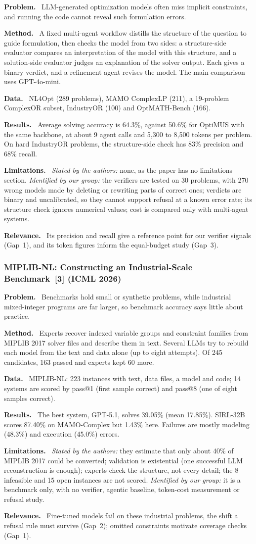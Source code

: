 \documentclass[11pt,a4paper]{article}
\newcommand{\elem}[1]{\par\noindent\textbf{#1.}~}
\begin{document}
\elem{Problem} LLM-generated optimization models often miss implicit constraints, and running the code cannot reveal such formulation errors.
\elem{Method} A fixed multi-agent workflow distills the structure of the question to guide formulation, then checks the model from two sides: a structure-side evaluator compares an interpretation of the model with this structure, and a solution-side evaluator judges an explanation of the solver output. Each gives a binary verdict, and a refinement agent revises the model. The main comparison uses GPT-4o-mini.
\elem{Data} NL4Opt (289 problems), MAMO ComplexLP (211), a 19-problem ComplexOR subset, IndustryOR (100) and OptMATH-Bench (166).
\elem{Results} Average solving accuracy is 64.3\%, against 50.6\% for OptiMUS with the same backbone, at about 9 agent calls and 5,300 to 8,500 tokens per problem. On hard IndustryOR problems, the structure-side check has 83\% precision and 68\% recall.
\elem{Limitations} \textit{Stated by the authors:} none, as the paper has no limitations section. \textit{Identified by our group:} the verifiers are tested on 30 problems, with 270 wrong models made by deleting or rewriting parts of correct ones; verdicts are binary and uncalibrated, so they cannot support refusal at a known error rate; its structure check ignores numerical values; cost is compared only with multi-agent systems.
\elem{Relevance} Its precision and recall give a reference point for our verifier signals (Gap~1), and its token figures inform the equal-budget study (Gap~3).

\subsubsection[MIPLIB-NL (ICML 2026)]{MIPLIB-NL: Constructing an Industrial-Scale Benchmark~[3] (ICML 2026)}

\elem{Problem} Benchmarks hold small or synthetic problems, while industrial mixed-integer programs are far larger, so benchmark accuracy says little about practice.
\elem{Method} Experts recover indexed variable groups and constraint families from MIPLIB 2017 solver files and describe them in text. Several LLMs try to rebuild each model from the text and data alone (up to eight attempts). Of 245 candidates, 163 passed and experts kept 60 more.
\elem{Data} MIPLIB-NL: 223 instances with text, data files, a model and code; 14 systems are scored by pass@1 (first sample correct) and pass@8 (one of eight samples correct).
\elem{Results} The best system, GPT-5.1, solves 39.05\% (mean 17.85\%). SIRL-32B scores 87.40\% on MAMO-Complex but 1.43\% here. Failures are mostly modeling (48.3\%) and execution (45.0\%) errors.
\elem{Limitations} \textit{Stated by the authors:} they estimate that only about 40\% of MIPLIB 2017 could be converted; validation is existential (one successful LLM reconstruction is enough); experts check the structure, not every detail; the 8 infeasible and 15 open instances are not scored. \textit{Identified by our group:} it is a benchmark only, with no verifier, agentic baseline, token-cost measurement or refusal study.
\elem{Relevance} Fine-tuned models fail on these industrial problems, the shift a refusal rule must survive (Gap~2); omitted constraints motivate coverage checks (Gap~1).
\end{document}
